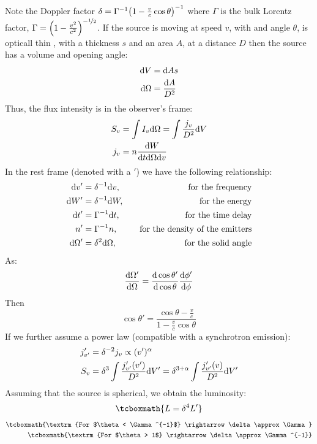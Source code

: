 \documentclass[10pt,a4paper,english]{article}
\let\originalleft\left
\let\originalright\right
\renewcommand{\left}{\mathopen{}\mathclose\bgroup\originalleft}
\renewcommand{\right}{\aftergroup\egroup\originalright}
\begin{document}
Note the Doppler factor
$\delta = \Gamma^{-1} \left( 1 - \frac{v}{c }\cos\theta \right)^{-1}$
where $\Gamma$ is the bulk Lorentz factor,
$\Gamma = \left( 1 - \frac{v^2}{c^2} \right)^{-\nicefrac{1}{2}}$. If
the source is moving at speed $v$, with and angle $\theta$, is
opticall thin , with a thickness $s$ and an area $A$, at a distance
$D$ then the source has a volume and opening angle:
\begin{align}
  \mathrm{d} V &= \mathrm{d} As \\
  \mathrm{d}\Omega &= \frac{\mathrm{d} A}{D^2}
\end{align}
Thus, the flux intensity is in the observer's frame:
\begin{align}
  S_v &= \int I_v\mathrm{d} \Omega = \int \frac{j_v}{D^2} \mathrm{d} V\\
  j_v &= n \frac{\mathrm{d} W}{\mathrm{d} t\mathrm{d} \Omega \mathrm{d} v}
\end{align}
In the rest frame (denoted with a ${}'$) we have the following
relationship:
\begin{align}
  \mathrm{d} v' &= \delta^{-1}\mathrm{d} v, &\quad \textrm{for the frequency} \\
  \mathrm{d} W' &= \delta^{-1}\mathrm{d} W, &\quad \textrm{for the energy} \\
  \mathrm{d} t' &= \Gamma^{-1}\mathrm{d} t, &\quad \textrm{for the time delay} \\
  n'    &= \Gamma^{-1} n,   &\quad \textrm{for the density of the emitters}\\
  \mathrm{d}\Omega' &= \delta^2\mathrm{d}\Omega, &\quad \textrm{for the solid angle}
\end{align}
As:
\begin{equation}
  \frac{\mathrm{d}\Omega'}{\mathrm{d}\Omega} = \frac{\mathrm{d}\cos\theta'}{\mathrm{d}\cos\theta}\frac{\mathrm{d}\phi'}{\mathrm{d}\phi}
\end{equation}
Then
\begin{equation}
 \cos\theta' = \frac{\cos\theta - \frac{v}{c}}{1 - \frac{v}{c}\cos\theta}
\end{equation}
If we further assume a power law (compatible with a synchrotron emission):
\begin{align}
  j_{v'}' &= \delta^{-2} j_v \propto (v')^\alpha \\
  S_v    &= \delta^3 \int \frac{j_{v'}' (v')}{D^2} \mathrm{d} V' = \delta^{3+\alpha}\int \frac{j_{v'}' (v)}{D^2}\mathrm{d} V'
\end{align}
Assuming that the source is spherical, we obtain the luminosity:
\begin{equation}
  \tcboxmath{
    L = \delta^4 L'
  }
\end{equation}
\begin{align}
  \tcboxmath{\textrm{For $\theta < \Gamma^{-1}$} \rightarrow \delta\approx\Gamma} \\
  \tcboxmath{\textrm{For $\theta > 1$} \rightarrow \delta\approx\Gamma^{-1}}
\end{align}
\end{document}
